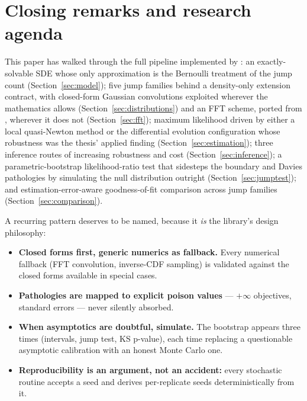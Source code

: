 \section{Closing remarks and research agenda}
\label{sec:closing}

This paper has walked through the full pipeline implemented by
: an exactly-solvable SDE whose only
approximation is the Bernoulli treatment of the jump count
(Section~\ref{sec:model}); five jump families behind a density-only
extension contract, with closed-form Gaussian convolutions exploited
wherever the mathematics allows (Section~\ref{sec:distributions}) and an
FFT scheme, ported from \citet{Ospina2009}, wherever it does not
(Section~\ref{sec:fft}); maximum likelihood driven by either a local
quasi-Newton method or the differential evolution configuration whose
robustness was the thesis' applied finding (Section~\ref{sec:estimation});
three inference routes of increasing robustness and cost
(Section~\ref{sec:inference}); a parametric-bootstrap likelihood-ratio
test that sidesteps the boundary and Davies pathologies by simulating the
null distribution outright (Section~\ref{sec:jumptest}); and
estimation-error-aware goodness-of-fit comparison across jump families
(Section~\ref{sec:comparison}).

A recurring pattern deserves to be named, because it \emph{is} the
library's design philosophy:

\begin{itemize}
  \item \textbf{Closed forms first, generic numerics as fallback.} Every
        numerical fallback (FFT convolution, inverse-CDF sampling) is
        validated against the closed forms available in special cases.
  \item \textbf{Pathologies are mapped to explicit poison values} ---
        $+\infty$ objectives,  standard errors --- never
        silently absorbed.
  \item \textbf{When asymptotics are doubtful, simulate.} The bootstrap
        appears three times (intervals, jump test, KS p-value), each time
        replacing a questionable asymptotic calibration with an honest
        Monte Carlo one.
  \item \textbf{Reproducibility is an argument, not an accident:} every
        stochastic routine accepts a seed and derives per-replicate seeds
        deterministically from it.
\end{itemize}

